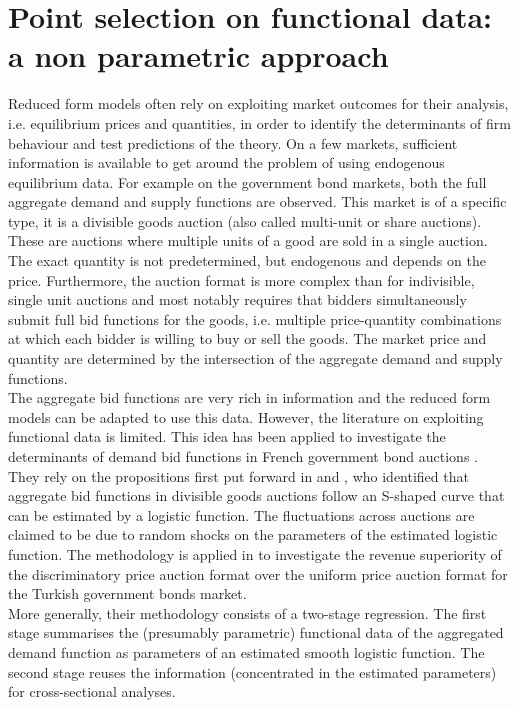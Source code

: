 \section{Point selection on functional data: a non parametric approach}
Reduced form models often rely on exploiting market outcomes for their analysis, i.e. equilibrium prices and quantities, in order to identify the determinants of firm behaviour and test predictions of the theory. On a few markets, sufficient information is available to get around the problem of using endogenous equilibrium data. For example on the government bond markets, both the full aggregate demand and supply functions are observed. This market is of a specific type, it is a divisible goods auction (also called multi-unit or share auctions). These are auctions where multiple units of a good are sold in a single auction. The exact quantity is not predetermined, but endogenous and depends on the price. Furthermore, the auction format is more complex than for indivisible, single unit auctions and most notably requires that bidders simultaneously submit full bid functions for the goods, i.e. multiple price-quantity combinations at which each bidder is willing to buy or sell the goods. The market price and quantity are determined by the intersection of the aggregate demand and supply functions.\\

The aggregate bid functions are very rich in information and the reduced form models can be adapted to use this data. However, the literature on exploiting functional data is limited. This idea has been applied to investigate the determinants of demand bid functions in French government bond auctions \cite{preget2005treasury}. They rely on the propositions first put forward in \cite{boukai1998market} and \cite{berg1999bid}, who identified that aggregate bid functions in divisible goods auctions follow an S-shaped curve that can be estimated by a logistic function. The fluctuations across auctions are claimed to be due to random shocks on the parameters of the estimated logistic function. The methodology is applied in \cite{ozcan2004logistic} to investigate the revenue superiority of the discriminatory price auction format over the uniform price auction format for the Turkish government bonds market.\\

More generally, their methodology consists of a two-stage regression. The first stage summarises the (presumably parametric) functional data of the aggregated demand function as parameters of an estimated smooth logistic function. The second stage reuses the information (concentrated in the estimated parameters) for cross-sectional analyses.\\

